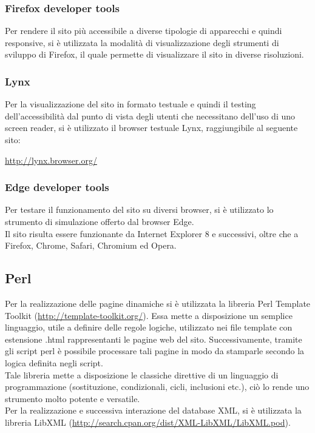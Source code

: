 		\subsubsection{Firefox developer tools}
		Per rendere il sito più accessibile a diverse tipologie di apparecchi e quindi responsive, si è utilizzata la modalità di visualizzazione degli strumenti di sviluppo di Firefox, il quale permette di visualizzare il sito in diverse risoluzioni.
		
		\subsubsection{Lynx}
		Per la visualizzazione del sito in formato testuale e quindi il testing dell'accessibilità dal punto di vista degli utenti che necessitano dell'uso di uno screen reader, si è utilizzato il browser testuale Lynx, raggiungibile al seguente sito:
		\begin{center}
			\url {http://lynx.browser.org/}
		\end{center}
		
		\subsubsection{Edge developer tools}
		Per testare il funzionamento del sito su diversi browser, si è utilizzato lo strumento di simulazione offerto dal browser Edge. \\
		Il sito risulta essere funzionante da Internet Explorer 8 e successivi, oltre che a Firefox, Chrome, Safari, Chromium ed Opera.
	
	\subsection{Perl}
	Per la realizzazione delle pagine dinamiche si è utilizzata la libreria Perl Template Toolkit (\url{http://template-toolkit.org/}). Essa mette a disposizione un semplice linguaggio, utile a definire delle regole logiche, utilizzato nei file template con estensione .html rappresentanti le pagine web del sito. Successivamente, tramite gli script perl è possibile processare tali pagine in modo da stamparle secondo la logica definita negli script. \\
	Tale libreria mette a disposizione le classiche direttive di un linguaggio di programmazione (sostituzione, condizionali, cicli, inclusioni etc.), ciò lo rende uno strumento molto potente e versatile. \\
	Per la realizzazione e successiva interazione del database XML, si è utilizzata la libreria LibXML (\url{http://search.cpan.org/dist/XML-LibXML/LibXML.pod}).
